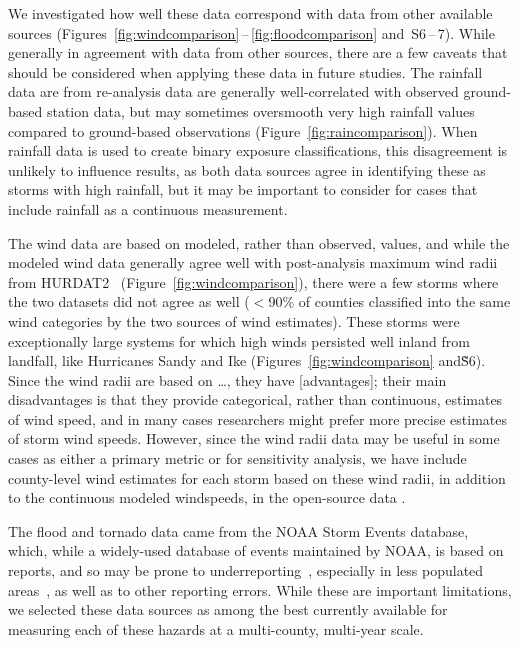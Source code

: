 We investigated how well these data correspond with data from other available
sources (Figures~\ref{fig:windcomparison}\,--\,\ref{fig:floodcomparison}
and~S6\,--\,7). While generally in agreement with data from other sources,
there are a few caveats that should be considered when applying these data in
future studies. The rainfall data are from re-analysis data are generally
well-correlated with observed ground-based station data, but may sometimes
oversmooth very high rainfall values compared to ground-based observations
(Figure~\ref{fig:raincomparison}). When rainfall data is used to create binary
exposure classifications, this disagreement is unlikely to influence results,
as both data sources agree in identifying these as storms with high rainfall,
but it may be important to consider for cases that include rainfall as a
continuous measurement. 

The wind data are based on modeled, rather than observed, values, and while the
modeled wind data generally agree well with post-analysis maximum wind radii
from \ac{HURDAT2}~\parencite{landsea2013} (Figure~\ref{fig:windcomparison}),
there were a few storms where the two datasets did not agree as well ($<$90\%
of counties classified into the same wind categories by the two sources of wind
estimates). These storms were exceptionally large systems for which high winds
persisted well inland from landfall, like Hurricanes Sandy and Ike
(Figures~\ref{fig:windcomparison} and\~S6). Since the wind radii are based on
\ldots, they have [advantages]; their main disadvantages is that they provide
categorical, rather than continuous, estimates of wind speed, and in many cases
researchers might prefer more precise estimates of storm wind speeds. However,
since the wind radii data may be useful in some cases as either a primary
metric or for sensitivity analysis, we have include county-level wind estimates
for each storm based on these wind radii, in addition to the continuous modeled
windspeeds, in the open-source data \cite{hurricaneexposuredata}.

The flood and tornado data came from the \ac{NOAA} Storm Events database,
which, while a widely-used database of events maintained by \ac{NOAA}, is based
on reports, and so may be prone to underreporting~\parencite{Ashley2008flood,
Curran2000}, especially in less populated areas~\parencite{Witt1998,
Ashley2007}, as well as to other reporting errors. While these are important
limitations, we selected these data sources as among the best currently
available for measuring each of these hazards at a multi-county, multi-year
scale.

